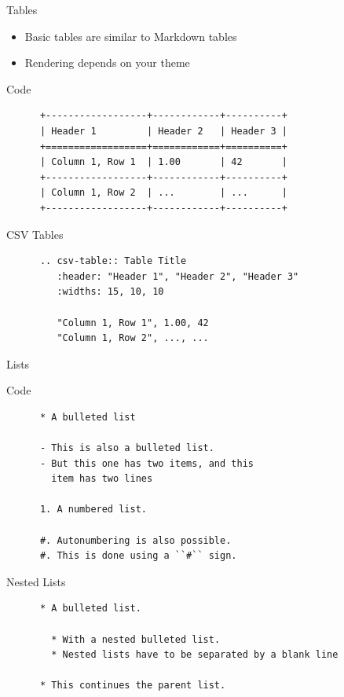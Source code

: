 \begin{frame}[fragile]{Tables}
  \begin{itemize}
    \item Basic tables are similar to Markdown tables
    \item Rendering depends on your theme
  \end{itemize}
  \begin{block}{Code}
    \begin{verbatim}
      +------------------+------------+----------+
      | Header 1         | Header 2   | Header 3 |
      +==================+============+==========+
      | Column 1, Row 1  | 1.00       | 42       |
      +------------------+------------+----------+
      | Column 1, Row 2  | ...        | ...      |
      +------------------+------------+----------+
    \end{verbatim}
  \end{block}
  \begin{block}{CSV Tables}
    \begin{verbatim}
      .. csv-table:: Table Title
         :header: "Header 1", "Header 2", "Header 3"
         :widths: 15, 10, 10

         "Column 1, Row 1", 1.00, 42
         "Column 1, Row 2", ..., ...
    \end{verbatim}
  \end{block}
\end{frame}

\begin{frame}[fragile]{Lists}
  \begin{block}{Code}
    \begin{verbatim}
      * A bulleted list
 
      - This is also a bulleted list.
      - But this one has two items, and this
        item has two lines

      1. A numbered list.
 
      #. Autonumbering is also possible.
      #. This is done using a ``#`` sign.
    \end{verbatim}
  \end{block}
  \begin{block}{Nested Lists}
    \begin{verbatim}
      * A bulleted list.

        * With a nested bulleted list.
        * Nested lists have to be separated by a blank line

      * This continues the parent list.
    \end{verbatim}
  \end{block}
\end{frame}


